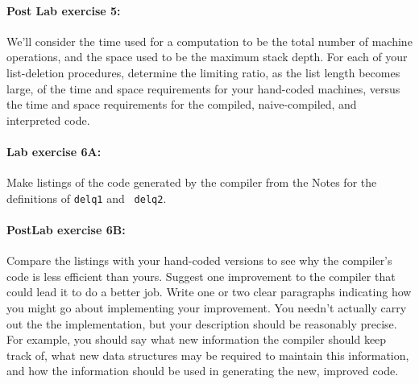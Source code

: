 \paragraph{Post Lab exercise 5:} We'll consider the time used for a
computation to be the total number of machine operations, and the space
used to be the maximum stack depth.  For each of your list-deletion
procedures, determine the limiting ratio, as the list length becomes
large, of the time and space requirements for your hand-coded machines,
versus the time and space requirements for the compiled, naive-compiled,
and interpreted code.


\paragraph{Lab exercise 6A:} Make listings of the code generated by the
compiler from the Notes for the definitions of {\tt delq1} and {\tt
delq2}.

\paragraph{PostLab exercise 6B:}
Compare the listings with your hand-coded versions to see why the
compiler's code is less efficient than yours.  Suggest one improvement to
the compiler that could lead it to do a better job.  Write one or two
clear paragraphs indicating how you might go about implementing your
improvement.  You needn't actually carry out the the implementation, but
your description should be reasonably precise.  For example, you should
say what new information the compiler should keep track of, what new data
structures may be required to maintain this information, and how the
information should be used in generating the new, improved code.


